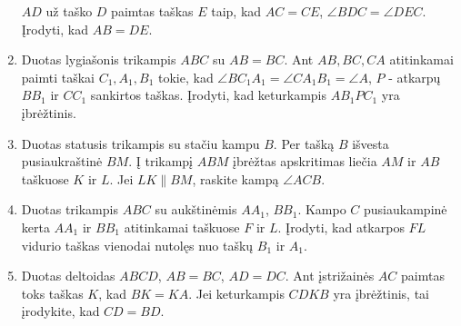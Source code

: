 \begin{enumerate}
  $AD$ už taško $D$ paimtas taškas $E$ taip, kad $AC=CE$,
  $\angle BDC=\angle DEC$. Įrodyti, kad $AB=DE$. 
\item Duotas lygiašonis trikampis $ABC$ su $AB = BC$. Ant
  $AB, BC, CA$ atitinkamai paimti taškai $C_1, A_1, B_1$
  tokie, kad $\angle BC_1A_1 = \angle CA_1B_1 = \angle A$,
  $P$ - atkarpų $BB_1$ ir $CC_1$ sankirtos taškas. Įrodyti,
  kad keturkampis $AB_1PC_1$ yra įbrėžtinis.
\item Duotas statusis trikampis su stačiu kampu $B$. Per
  tašką $B$ išvesta pusiaukraštinė $BM$. Į trikampį $ABM$
  įbrėžtas apskritimas liečia $AM$ ir $AB$ taškuose $K$ ir
  $L$. Jei $LK\parallel{BM}$, raskite kampą $\angle ACB$.
\item Duotas trikampis $ABC$ su aukštinėmis $AA_1$, $BB_1$.
  Kampo $C$ pusiaukampinė kerta $AA_1$ ir $BB_1$ atitinkamai
  taškuose $F$ ir $L$. Įrodyti, kad atkarpos $FL$ vidurio
  taškas vienodai nutolęs nuo taškų $B_1$ ir $A_1$.
\item Duotas deltoidas $ABCD$, $AB=BC$, $AD=DC$. Ant
  įstrižainės $AC$ paimtas toks taškas $K$, kad $BK = KA$.
  Jei keturkampis $CDKB$ yra  įbrėžtinis, tai įrodykite, kad
  $CD = BD$.

\end{enumerate}
